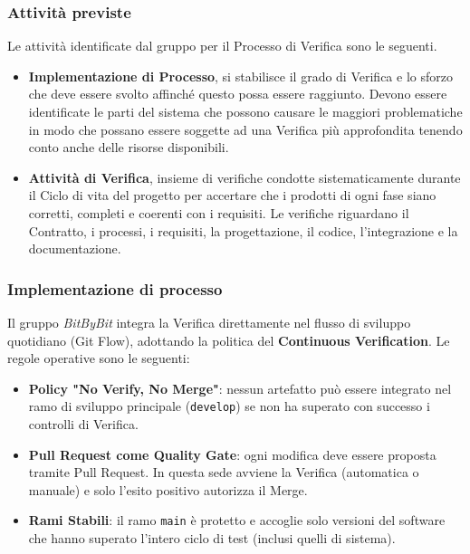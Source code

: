 \documentclass[a4paper,12pt]{article}
\begin{document}
\subsubsection{Attività previste}
Le attività identificate dal gruppo per il Processo di Verifica sono le seguenti.
\begin{itemize}
    \item \textbf{Implementazione di Processo}, si stabilisce il grado di Verifica e lo sforzo che deve essere svolto affinché questo 
    possa essere raggiunto. Devono essere identificate le parti del sistema che possono causare le maggiori problematiche in modo che possano essere 
    soggette ad una Verifica più approfondita tenendo conto anche delle risorse disponibili.
    \item \textbf{Attività di Verifica}, insieme di verifiche condotte sistematicamente durante il Ciclo di vita del progetto per 
    accertare che i prodotti di ogni fase siano corretti, completi e coerenti con i requisiti. 
    Le verifiche riguardano il Contratto, i processi, i requisiti, la progettazione, il codice, l'integrazione e la documentazione.
\end{itemize}

\subsubsection{Implementazione di processo}
Il gruppo \textit{BitByBit} integra la Verifica direttamente nel flusso di sviluppo quotidiano (Git Flow), adottando la politica del \textbf{Continuous Verification}.
Le regole operative sono le seguenti:
\begin{itemize}
    \item \textbf{Policy "No Verify, No Merge"}: nessun artefatto può essere integrato nel ramo di sviluppo principale (\texttt{develop}) se non ha superato con successo i controlli di Verifica.
    \item \textbf{Pull Request come Quality Gate}: ogni modifica deve essere proposta tramite Pull Request. In questa sede avviene la Verifica (automatica o manuale) e solo l'esito positivo autorizza il Merge.
    \item \textbf{Rami Stabili}: il ramo \texttt{main} è protetto e accoglie solo versioni del software che hanno superato l'intero ciclo di test (inclusi quelli di sistema).
\end{itemize}
\end{document}
